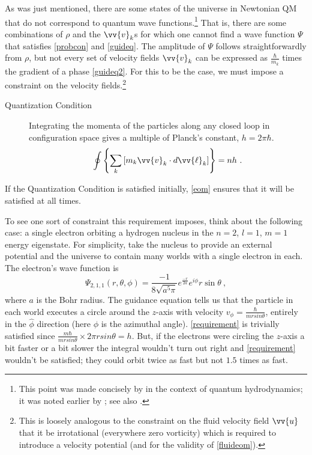 \documentclass[12pt,secnumarabic,balancelastpage,amsmath,amssymb,nofootinbib]{article}
\begin{document}
As was just mentioned, there are some states of the universe in Newtonian QM that do not correspond to quantum wave functions.\footnote{This point was made concisely by \citet{wallstrom1994} in the context of quantum hydrodynamics; it was noted earlier by \citet{takabayasi1952}; see also \citet[][eq. 4.14]{holland2005}.}  That is, there are some combinations of $\rho$ and the $\vv{v}_k$s for which one cannot find a wave function $\Psi$ that satisfies \eqref{probcon} and \eqref{guideq}.  The amplitude of $\Psi$ follows straightforwardly from $\rho$, but not every set of velocity fields $\vv{v}_k$ can be expressed as $\frac{\hbar}{m_k}$ times the gradient of a phase \eqref{guideq2}.  For this to be the case, we must impose a constraint on the velocity fields.\footnote{This is loosely analogous to the constraint on the fluid velocity field $\vv{u}$ that it be irrotational (everywhere zero vorticity) which is required to introduce a velocity potential (and for the validity of \eqref{fluideom}).}
\begin{description}
\item[Quantization Condition]  Integrating the momenta of the particles along any closed loop in configuration space gives a multiple of Planck's constant, $h=2\pi\hbar$.
\begin{equation}
\oint{\left\{\sum_k{\left[m_k\vv{v}_k \cdot d\vv{\ell}_k\right]}\right\}}=nh\ .
\label{requirement}
\end{equation}
\end{description}
If the Quantization Condition is satisfied initially, \eqref{eom} ensures that it will be satisfied at all times.

To see one sort of constraint this requirement imposes, think about the following case: a single electron orbiting a hydrogen nucleus in the $n=2$, $l=1$, $m=1$ energy eigenstate.  For simplicity, take the nucleus to provide an external potential and the universe to contain many worlds with a single electron in each.  The electron's wave function is
\begin{equation}
\Psi_{2,1,1}(r,\theta,\phi)=\frac{-1}{8 \sqrt{a^5 \pi}}e^{\frac{-r}{2a}}e^{i\phi}r\sin \theta\ ,
\label{circlingelectrons}
\end{equation}
where $a$ is the Bohr radius.  The guidance equation tells us that the particle in each world executes a circle around the $z$-axis with velocity $v_{\phi}=\frac{\hbar}{m r sin{\theta}}$, entirely in the $\widehat{\phi}$ direction (here $\phi$ is the azimuthal angle).  \eqref{requirement} is trivially satisfied since $\frac{m \hbar}{m r sin{\theta}} \times 2 \pi r sin{\theta}=h$.  But, if the electrons were circling the $z$-axis a bit faster or a bit slower the integral wouldn't turn out right and \eqref{requirement} wouldn't be satisfied; they could orbit twice as fast but not $1.5$ times as fast.
\end{document}
